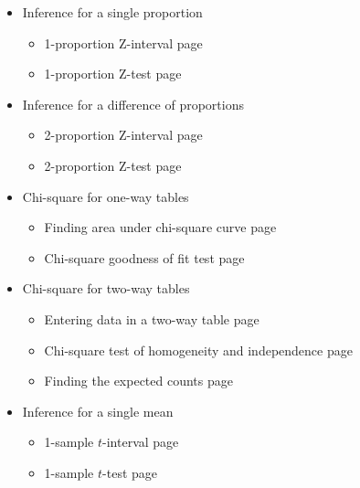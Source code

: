 \begin{itemize}
\item[]  Inference for a single proportion

\begin{itemize}\vspace{-1mm}
\setlength{\itemsep}{0mm}
\item[] 1-proportion Z-interval \hfill page~\pageref{1PropZInt}
\item[] 1-proportion Z-test \hfill page~\pageref{1propZtest}
\end{itemize}

\item[] Inference for a difference of proportions
\begin{itemize}\vspace{-1mm}
\setlength{\itemsep}{0mm}
\item[] 2-proportion Z-interval \hfill page~\pageref{2propZint}
\item[] 2-proportion Z-test \hfill page~\pageref{2propZtest}
\end{itemize}


\item[] Chi-square for one-way tables
\begin{itemize}\vspace{-1mm}
\setlength{\itemsep}{0mm}
\item[] Finding area under chi-square curve \hfill page~\pageref{chisqtail}
\item[] Chi-square goodness of fit test \hfill page~\pageref{GOF}
\end{itemize}


\item[]  Chi-square for two-way tables
\begin{itemize}\vspace{-1mm}
\setlength{\itemsep}{0mm}
\item[] Entering data in a two-way table \hfill page~\pageref{2waytable}
\item[] Chi-square test of homogeneity and independence  \hfill page~\pageref{chisq2waytest}
\item[] Finding the expected counts  \hfill page~\pageref{expectedcounts}
\end{itemize}

\item[]  Inference for a single mean
\begin{itemize}\vspace{-1mm}
\setlength{\itemsep}{0mm}
\item[] 1-sample $t$-interval \hfill page~\pageref{1SampTint}
\item[] 1-sample $t$-test  \hfill page~\pageref{1SampTtest}
\end{itemize}




\end{itemize}
